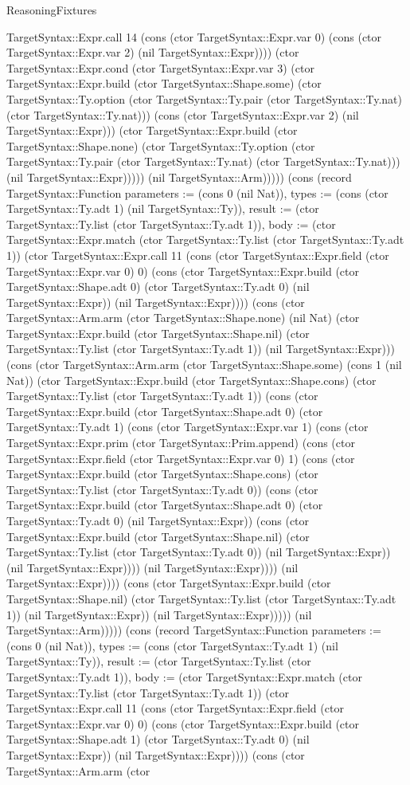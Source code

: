 \begin{lexlean}{ReasoningFixtures}
\begin{semanticmodule}
{TargetSyntax::Expr.call 14 (cons (ctor TargetSyntax::Expr.var 0) (cons (ctor TargetSyntax::Expr.var 2) (nil TargetSyntax::Expr)))) (ctor TargetSyntax::Expr.cond (ctor TargetSyntax::Expr.var 3) (ctor TargetSyntax::Expr.build (ctor TargetSyntax::Shape.some) (ctor TargetSyntax::Ty.option (ctor TargetSyntax::Ty.pair (ctor TargetSyntax::Ty.nat) (ctor TargetSyntax::Ty.nat))) (cons (ctor TargetSyntax::Expr.var 2) (nil TargetSyntax::Expr))) (ctor TargetSyntax::Expr.build (ctor TargetSyntax::Shape.none) (ctor TargetSyntax::Ty.option (ctor TargetSyntax::Ty.pair (ctor TargetSyntax::Ty.nat) (ctor TargetSyntax::Ty.nat))) (nil TargetSyntax::Expr))))) (nil TargetSyntax::Arm))))}) (cons (record TargetSyntax::Function {parameters := (cons 0 (nil Nat)), types := (cons (ctor TargetSyntax::Ty.adt 1) (nil TargetSyntax::Ty)), result := (ctor TargetSyntax::Ty.list (ctor TargetSyntax::Ty.adt 1)), body := (ctor TargetSyntax::Expr.match (ctor TargetSyntax::Ty.list (ctor TargetSyntax::Ty.adt 1)) (ctor TargetSyntax::Expr.call 11 (cons (ctor TargetSyntax::Expr.field (ctor TargetSyntax::Expr.var 0) 0) (cons (ctor TargetSyntax::Expr.build (ctor TargetSyntax::Shape.adt 0) (ctor TargetSyntax::Ty.adt 0) (nil TargetSyntax::Expr)) (nil TargetSyntax::Expr)))) (cons (ctor TargetSyntax::Arm.arm (ctor TargetSyntax::Shape.none) (nil Nat) (ctor TargetSyntax::Expr.build (ctor TargetSyntax::Shape.nil) (ctor TargetSyntax::Ty.list (ctor TargetSyntax::Ty.adt 1)) (nil TargetSyntax::Expr))) (cons (ctor TargetSyntax::Arm.arm (ctor TargetSyntax::Shape.some) (cons 1 (nil Nat)) (ctor TargetSyntax::Expr.build (ctor TargetSyntax::Shape.cons) (ctor TargetSyntax::Ty.list (ctor TargetSyntax::Ty.adt 1)) (cons (ctor TargetSyntax::Expr.build (ctor TargetSyntax::Shape.adt 0) (ctor TargetSyntax::Ty.adt 1) (cons (ctor TargetSyntax::Expr.var 1) (cons (ctor TargetSyntax::Expr.prim (ctor TargetSyntax::Prim.append) (cons (ctor TargetSyntax::Expr.field (ctor TargetSyntax::Expr.var 0) 1) (cons (ctor TargetSyntax::Expr.build (ctor TargetSyntax::Shape.cons) (ctor TargetSyntax::Ty.list (ctor TargetSyntax::Ty.adt 0)) (cons (ctor TargetSyntax::Expr.build (ctor TargetSyntax::Shape.adt 0) (ctor TargetSyntax::Ty.adt 0) (nil TargetSyntax::Expr)) (cons (ctor TargetSyntax::Expr.build (ctor TargetSyntax::Shape.nil) (ctor TargetSyntax::Ty.list (ctor TargetSyntax::Ty.adt 0)) (nil TargetSyntax::Expr)) (nil TargetSyntax::Expr)))) (nil TargetSyntax::Expr)))) (nil TargetSyntax::Expr)))) (cons (ctor TargetSyntax::Expr.build (ctor TargetSyntax::Shape.nil) (ctor TargetSyntax::Ty.list (ctor TargetSyntax::Ty.adt 1)) (nil TargetSyntax::Expr)) (nil TargetSyntax::Expr))))) (nil TargetSyntax::Arm))))}) (cons (record TargetSyntax::Function {parameters := (cons 0 (nil Nat)), types := (cons (ctor TargetSyntax::Ty.adt 1) (nil TargetSyntax::Ty)), result := (ctor TargetSyntax::Ty.list (ctor TargetSyntax::Ty.adt 1)), body := (ctor TargetSyntax::Expr.match (ctor TargetSyntax::Ty.list (ctor TargetSyntax::Ty.adt 1)) (ctor TargetSyntax::Expr.call 11 (cons (ctor TargetSyntax::Expr.field (ctor TargetSyntax::Expr.var 0) 0) (cons (ctor TargetSyntax::Expr.build (ctor TargetSyntax::Shape.adt 1) (ctor TargetSyntax::Ty.adt 0) (nil TargetSyntax::Expr)) (nil TargetSyntax::Expr)))) (cons (ctor TargetSyntax::Arm.arm (ctor }
\end{semanticmodule}
\end{lexlean}
